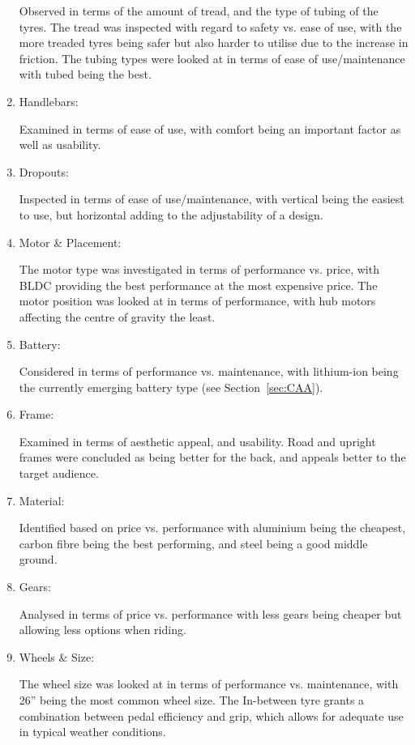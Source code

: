 \documentclass[a4paper,11pt]{article}
\begin{document}
\begin{enumerate}[leftmargin=0pt, itemindent=20pt,labelwidth=15pt, labelsep=5pt, listparindent=0.7cm,align=left]
Observed in terms of the amount of tread, and the type of tubing of the tyres. The tread was inspected with regard to safety vs. ease of use, with the more treaded tyres being safer but also harder to utilise due to the increase in friction. The tubing types were looked at in terms of ease of use/maintenance with tubed being the best.

	\item Handlebars:

Examined in terms of ease of use, with comfort being an important factor as well as usability.

	\item Dropouts:

Inspected in terms of ease of use/maintenance, with vertical being the easiest to use, but horizontal adding to the adjustability of a design.

	\item Motor \& Placement:

The motor type was investigated in terms of performance vs. price, with BLDC providing the best performance at the most expensive price. The motor position was looked at in terms of performance, with hub motors affecting the centre of gravity the least.

	\item Battery:

		Considered in terms of performance vs. maintenance, with lithium-ion being the currently emerging battery type (see Section~\ref{sec:CAA}). 

	\item Frame:

Examined in terms of aesthetic appeal, and usability. Road and upright frames were concluded as being better for the back, and appeals better to the target audience.

	\item Material:

Identified based on price vs. performance with aluminium being the cheapest, carbon fibre being the best performing, and steel being a good middle ground.
	
	\item Gears:

Analysed in terms of price vs. performance with less gears being cheaper but allowing less options when riding.

	\item Wheels \& Size:

The wheel size was looked at in terms of performance vs. maintenance, with 26'' being the most common wheel size. The In-between tyre grants a combination between pedal efficiency and grip, which allows for adequate use in typical weather conditions.

\end{enumerate}
\end{document}
